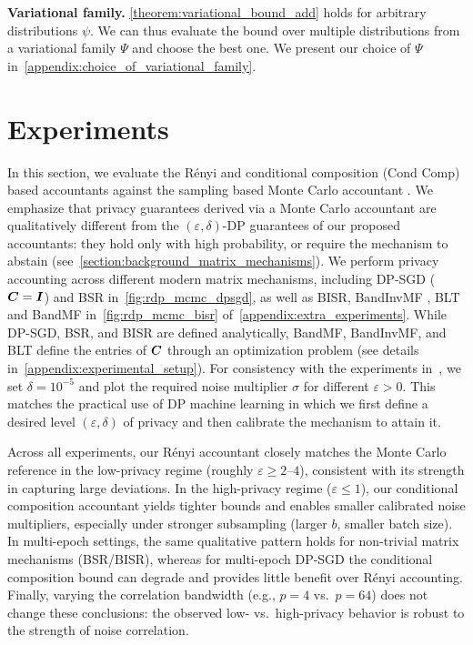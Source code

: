 \documentclass{article}
\theoremstyle{plain}
\theoremstyle{definition}
\theoremstyle{remark}
\renewcommand{\epsilon}{\varepsilon}
\begin{document}
\textbf{Variational family.} \cref{theorem:variational_bound_add} holds for arbitrary distributions $\psi$. 
We can thus evaluate the bound over multiple distributions from a variational family $\Psi$ and choose the best one.
We present  our choice of $\Psi$ in~\cref{appendix:choice_of_variational_family}. 


\section{Experiments}

In this section, we evaluate the R\'enyi and conditional composition (Cond Comp) based accountants against the sampling based Monte Carlo accountant \citep{choquette2024near}.
We emphasize that privacy guarantees derived via a Monte Carlo accountant are qualitatively different from the $(\epsilon,\delta)$-DP guarantees of our proposed accountants: they hold only with high probability, or require the mechanism to abstain (see~\cref{section:background_matrix_mechanisms}). We perform privacy accounting across different modern matrix mechanisms, including  
DP-SGD (${\bm{C}} = {\bm{I}}$) and BSR \citep{kalinin2024banded} in~\cref{fig:rdp_mcmc_dpsgd},
as well as BISR, BandInvMF \citep{kalinin2025back}, BLT \citep{dvijotham2024efficient} and BandMF \citep{mckenna2024scaling}  in~\cref{fig:rdp_mcmc_bisr} of~\cref{appendix:extra_experiments}. 
While DP-SGD, BSR, and BISR are defined analytically,
BandMF, BandInvMF, and BLT define the entries of ${\bm{C}}$ through an optimization problem (see details in~\cref{appendix:experimental_setup}).
For consistency with the experiments in~\cite{choquette2024near}, we set $\delta=10^{-5}$
and plot the required noise multiplier $\sigma$ for different $\epsilon > 0$.
This matches the practical use of DP machine learning in which we 
first define a desired level $(\epsilon,\delta)$ of privacy and then calibrate the mechanism to attain it.

Across all experiments, our R\'enyi accountant closely matches the Monte Carlo reference in the low-privacy regime (roughly $\epsilon \ge 2$--$4$), consistent with its strength in capturing large deviations. In the high-privacy regime ($\epsilon \le 1$), our conditional composition accountant yields tighter bounds and enables smaller calibrated noise multipliers, especially under stronger subsampling (larger $b$, smaller batch size). In multi-epoch settings, the same qualitative pattern holds for non-trivial matrix mechanisms (BSR/BISR), whereas for multi-epoch DP-SGD the conditional composition bound can degrade and provides little benefit over R\'enyi accounting. Finally, varying the correlation bandwidth (e.g., $p=4$ vs.\ $p=64$) does not change these conclusions: the observed low- vs.\ high-privacy behavior is robust to the strength of noise correlation.
\end{document}
